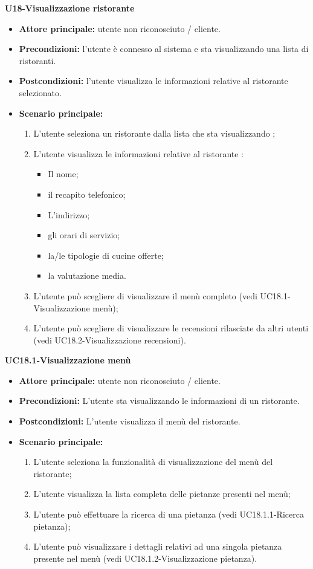 \textbf{U18-Visualizzazione ristorante}
\begin{itemize}
\item \textbf{Attore principale:} utente non riconosciuto / cliente.
\item \textbf{Precondizioni:} l'utente è connesso al sistema e sta visualizzando una lista di ristoranti.
\item \textbf{Postcondizioni:} l'utente visualizza le informazioni relative al ristorante selezionato.
\item \textbf{Scenario principale:}
\begin{enumerate}
    \item L'utente seleziona un ristorante dalla lista che sta visualizzando ;
    \item L'utente visualizza le informazioni relative al ristorante :
    \begin{itemize}
        \item Il nome;
        \item il recapito telefonico;
        \item L'indirizzo;
        \item gli orari di servizio;
        \item la/le tipologie di cucine offerte;
        \item la valutazione media.
    \end{itemize}
    \item L'utente può scegliere di visualizzare il menù completo (vedi UC18.1-Visualizzazione menù);
    \item L'utente può scegliere di visualizzare le recensioni rilasciate da altri utenti (vedi UC18.2-Visualizzazione recensioni).
\end{enumerate}
\end{itemize}

\textbf{UC18.1-Visualizzazione menù}
\begin{itemize}
\item \textbf{Attore principale:} utente non riconosciuto / cliente.
\item \textbf{Precondizioni:} L'utente sta visualizzando le informazioni di un ristorante.
\item \textbf{Postcondizioni:} L'utente visualizza il menù del ristorante.
\item \textbf{Scenario principale:}
\begin{enumerate}
    \item L'utente seleziona la funzionalità di visualizzazione del menù del ristorante;
    \item L'utente visualizza la lista completa delle pietanze presenti nel menù;
    \item L'utente può effettuare la ricerca di una pietanza (vedi UC18.1.1-Ricerca pietanza);
    \item L'utente può visualizzare i dettagli relativi ad una singola pietanza presente
     nel menù (vedi UC18.1.2-Visualizzazione pietanza).
\end{enumerate}
\end{itemize}

